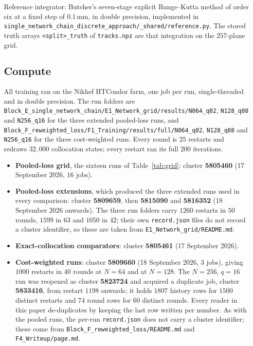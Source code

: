 \documentclass[11pt,a4paper]{article}
\newcommand{\mm}{\ensuremath{\,\mathrm{mm}}}
\begin{document}
Reference integrator: Butcher's seven-stage explicit Runge--Kutta method of
order six at a fixed step of $0.1\mm$, in double precision, implemented in
\texttt{single\_network\_chain\_discrete\_approach/\_shared/reference.py}. The
stored truth arrays \texttt{<split>\_truth} of \texttt{tracks.npz} are that
integration on the $257$-plane grid.

\subsection*{Compute}

All training ran on the Nikhef HTCondor farm, one job per run, single-threaded
and in double precision. The run folders are
\texttt{Block\_E\_single\_network\_chain/}\allowbreak\texttt{E1\_Network\_grid/results/}\allowbreak\texttt{N064\_q02},
\texttt{N128\_q08} and \texttt{N256\_q16} for the three extended pooled-loss
runs, and
\texttt{Block\_F\_reweighted\_loss/}\allowbreak\texttt{F1\_Training/results/full/}\allowbreak\texttt{N064\_q02},
\texttt{N128\_q08} and \texttt{N256\_q16} for the three cost-weighted runs. Every round is $25$
restarts and redraws $32{,}000$ collocation states; every restart ran its full
$200$ iterations.

\begin{itemize}
  \item \textbf{Pooled-loss grid}, the sixteen runs of Table~\ref{tab:grid}:
  cluster \textbf{5805460} (17 September 2026, $16$ jobs).
  \item \textbf{Pooled-loss extensions}, which produced the three extended runs
  used in every comparison: cluster \textbf{5809659}, then \textbf{5815090} and
  \textbf{5816352} (18 September 2026 onwards). The three run folders carry
  $1260$ restarts in $50$ rounds, $1599$ in $63$ and $1050$ in $42$; their own
  \texttt{record.json} files do not record a cluster identifier, so these are
  taken from \texttt{E1\_Network\_grid/README.md}.
  \item \textbf{Exact-collocation comparators}: cluster \textbf{5805461}
  (17 September 2026).
  \item \textbf{Cost-weighted runs}: cluster \textbf{5809660} (18 September 2026,
  $3$ jobs), giving $1000$ restarts in $40$ rounds at $N = 64$ and at
  $N = 128$. The $N = 256$, $q = 16$ run was reopened as cluster
  \textbf{5823724} and acquired a duplicate job, cluster \textbf{5833416}, from
  restart $1198$ onwards; it holds $1807$ history rows for $1500$ distinct
  restarts and $74$ round rows for $60$ distinct rounds. Every reader in this
  paper de-duplicates by keeping the last row written per number. As with the
  pooled runs, the per-run \texttt{record.json} does not carry a cluster
  identifier; these come from
  \texttt{Block\_F\_reweighted\_loss/README.md} and
  \texttt{F4\_Writeup/page.md}.
\end{itemize}
\end{document}

